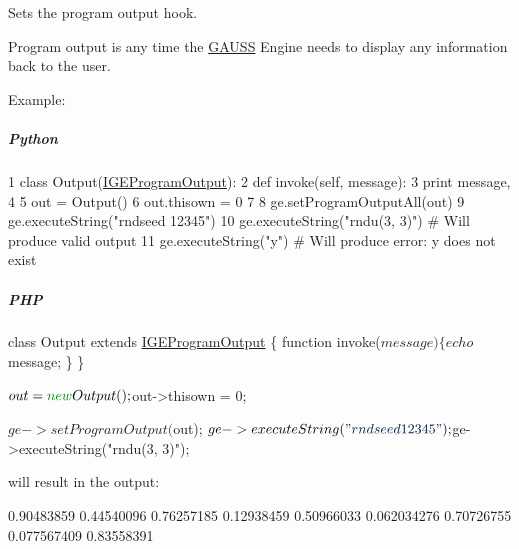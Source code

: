 Sets the program output hook. 

Program output is any time the \hyperlink{class_g_a_u_s_s}{G\-A\-U\-S\-S} Engine needs to display any information back to the user.

Example\-:

\subparagraph*{Python}


\begin{DoxyCode}
1 \textcolor{keyword}{class }Output(\hyperlink{class_i_g_e_program_output}{IGEProgramOutput}):
2     \textcolor{keyword}{def }invoke(self, message):
3         \textcolor{keywordflow}{print} message,
4 
5 out = Output()
6 out.thisown = 0
7 
8 ge.setProgramOutputAll(out)
9 ge.executeString(\textcolor{stringliteral}{"rndseed 12345"})
10 ge.executeString(\textcolor{stringliteral}{"rndu(3, 3)"})  \textcolor{comment}{# Will produce valid output}
11 ge.executeString(\textcolor{stringliteral}{"y"})           \textcolor{comment}{# Will produce error: y does not exist}
\end{DoxyCode}


\subparagraph*{P\-H\-P}


\begin{DoxyCode}
\textcolor{keyword}{class }Output \textcolor{keyword}{extends} \hyperlink{class_i_g_e_program_output}{IGEProgramOutput} \{
    \textcolor{keyword}{function} invoke($message) \{
        echo $message;
    \}
\}

$out = \textcolor{keyword}{new} Output();
$out->thisown = 0;

$ge->setProgramOutput($out);
$ge->executeString(\textcolor{stringliteral}{"rndseed 12345"});
$ge->executeString(\textcolor{stringliteral}{"rndu(3, 3)"});
\end{DoxyCode}


will result in the output\-: 
\begin{DoxyCode}
0.90483859        0.44540096        0.76257185
0.12938459        0.50966033       0.062034276
0.70726755       0.077567409        0.83558391
\end{DoxyCode}



